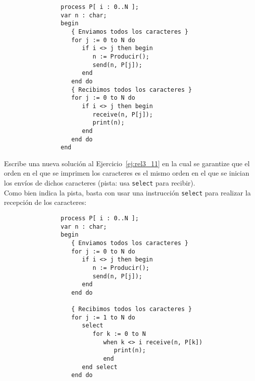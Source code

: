 \begin{ejercicio}
\begin{itemize}
            \begin{verbatim}
                process P[ i : 0..N ];
                var n : char;
                begin
                   { Enviamos todos los caracteres }
                   for j := 0 to N do
                      if i <> j then begin
                         n := Producir();
                         send(n, P[j]);
                      end
                   end do
                   { Recibimos todos los caracteres }
                   for j := 0 to N do
                      if i <> j then begin
                         receive(n, P[j]);
                         print(n);
                      end
                   end do
                end
            \end{verbatim}
    \end{itemize}
\end{ejercicio}

\begin{ejercicio}\label{ej:rel3_12}
    Escribe una nueva solución al Ejercicio~\ref{ej:rel3_11} en la cual se garantize que el orden en el que se imprimen los caracteres es el mismo orden en el que se inician los envíos de dichos caracteres (pista: usa \verb|select| para recibir).\\

    Como bien indica la pista, basta con usar una instrucción \verb|select| para realizar la recepción de los caracteres:
            \begin{verbatim}
                process P[ i : 0..N ];
                var n : char;
                begin
                   { Enviamos todos los caracteres }
                   for j := 0 to N do
                      if i <> j then begin
                         n := Producir();
                         send(n, P[j]);
                      end
                   end do

                   { Recibimos todos los caracteres }
                   for j := 1 to N do
                      select
                         for k := 0 to N
                            when k <> i receive(n, P[k])
                               print(n);
                            end
                      end select
                   end do
            \end{verbatim}
\end{ejercicio}

